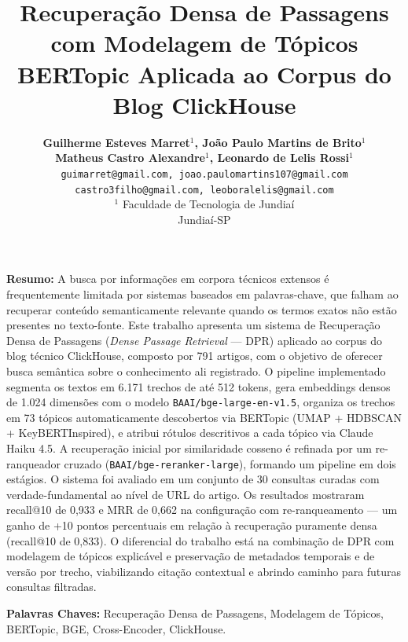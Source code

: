 \documentclass[11pt,a4paper]{article}
\title{\textbf{Recuperação Densa de Passagens com Modelagem de Tópicos BERTopic Aplicada ao Corpus do Blog ClickHouse}}
\author{
  \textbf{Guilherme Esteves Marret$^{1}$, João Paulo Martins de Brito$^{1}$} \\
  \textbf{Matheus Castro Alexandre$^{1}$, Leonardo de Lelis Rossi$^{1}$} \\[0.3em]
  \texttt{guimarret@gmail.com, joao.paulomartins107@gmail.com} \\
  \texttt{castro3filho@gmail.com, leoboralelis@gmail.com} \\[0.4em]
  $^{1}$ Faculdade de Tecnologia de Jundiaí \\
  Jundiaí-SP
}
\date{}
\begin{document}
\maketitle

\noindent \textbf{Resumo:} A busca por informações em corpora técnicos extensos é frequentemente limitada por sistemas baseados em palavras-chave, que falham ao recuperar conteúdo semanticamente relevante quando os termos exatos não estão presentes no texto-fonte. Este trabalho apresenta um sistema de Recuperação Densa de Passagens (\textit{Dense Passage Retrieval} --- DPR) aplicado ao corpus do blog técnico ClickHouse, composto por 791 artigos, com o objetivo de oferecer busca semântica sobre o conhecimento ali registrado. O pipeline implementado segmenta os textos em 6.171 trechos de até 512 tokens, gera embeddings densos de 1.024 dimensões com o modelo \texttt{BAAI/bge-large-en-v1.5}, organiza os trechos em 73 tópicos automaticamente descobertos via BERTopic (UMAP + HDBSCAN + KeyBERTInspired), e atribui rótulos descritivos a cada tópico via Claude Haiku 4.5. A recuperação inicial por similaridade cosseno é refinada por um re-ranqueador cruzado (\texttt{BAAI/bge-reranker-large}), formando um pipeline em dois estágios. O sistema foi avaliado em um conjunto de 30 consultas curadas com verdade-fundamental ao nível de URL do artigo. Os resultados mostraram recall@10 de 0,933 e MRR de 0,662 na configuração com re-ranqueamento --- um ganho de +10 pontos percentuais em relação à recuperação puramente densa (recall@10 de 0,833). O diferencial do trabalho está na combinação de DPR com modelagem de tópicos explicável e preservação de metadados temporais e de versão por trecho, viabilizando citação contextual e abrindo caminho para futuras consultas filtradas.

\vspace{0.5em}
\noindent \textbf{Palavras Chaves:} Recuperação Densa de Passagens, Modelagem de Tópicos, BERTopic, BGE, Cross-Encoder, ClickHouse.
\end{document}
